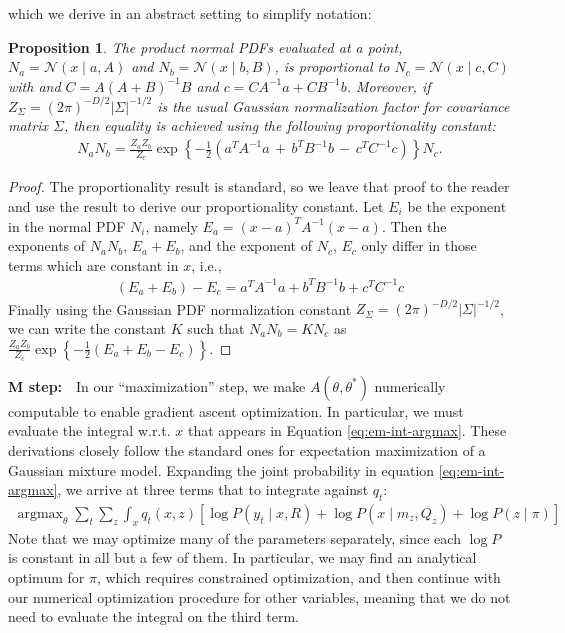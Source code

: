\documentclass{article}         %
\newtheorem{proposition}{Proposition}[section]
\DeclareMathOperator{\argmax}{\arg\max}
\newcommand{\inv}{^{-1}}
\newcommand{\NN}{\mathcal{N}}
\newcommand{\abs}[1]{\left| #1 \right|}
\newcommand{\cb}[1]{\left\{ #1 \right\}}
\newcommand{\pn}[1]{\left( #1 \right)}
\newcommand{\bc}[1]{\left[ #1 \right]}
\begin{document}
which we derive in an abstract setting to simplify notation:
\begin{proposition}
    The product normal PDFs evaluated at a point, $N_a = \NN(x\mid a, A)$ and $N_b = \NN(x\mid b, B)$, is proportional to $N_c = \NN(x\mid c, C)$ with and $C = A\pn{A + B}\inv B$ and $c = CA\inv a + CB\inv b$. Moreover, if $Z_\Sigma = \pn{2\pi}^{-D/2}\abs{\Sigma}^{-1/2}$ is the usual Gaussian normalization factor for covariance matrix $\Sigma$, then equality is achieved using the following proportionality constant:
    \begin{align}
        N_a N_b = \frac{Z_aZ_b}{Z_c} \exp\cb{-\frac{1}{2}\pn{a^TA\inv a \,+\, b^TB\inv b \,-\, c^T C\inv c}} N_c.
    \end{align}
\end{proposition}
\begin{proof}
The proportionality result is standard, so we leave that proof to the reader and use the result to derive our proportionality constant. Let $E_i$ be the exponent in the normal PDF $N_i$, namely $E_a = (x - a)^TA\inv (x - a)$. Then the exponents of $N_aN_b$, $E_a + E_b$, and the exponent of $N_c$, $E_c$ only differ in those terms which are constant in $x$, i.e., 
\begin{align}
    \pn{E_a + E_b} - E_c = a^TA\inv a + b^TB\inv b + c^T C\inv c
\end{align}
Finally using the Gaussian PDF normalization constant $Z_\Sigma = \pn{2\pi}^{-D/2}\abs{\Sigma}^{-1/2}$, we can write the constant $K$ such that $N_aN_b = K N_c$ as $\frac{Z_aZ_b}{Z_c} \exp\cb{-\frac{1}{2}\pn{E_a + E_b - E_c}}$.
\end{proof}

\textbf{M step:}\ \ In our ``maximization'' step, we make $A(\theta, \theta^*)$ numerically computable to enable gradient ascent optimization. In particular, we must evaluate the integral w.r.t. $x$ that appears in Equation \ref{eq:em-int-argmax}. These derivations closely follow the standard ones for expectation maximization of a Gaussian mixture model. Expanding the joint probability in equation \ref{eq:em-int-argmax}, we arrive at three terms that to integrate against $q_t$:
\begin{align}
    \argmax_{\theta} \sum_{t}\sum_{z}\int_{x} q_t(x, z) \bc{ \log P(y_t \mid x, R) + \log P(x \mid m_{z}, Q_{z}) + \log P(z \mid \pi)}
\end{align}
Note that we may optimize many of the parameters separately, since each $\log P$ is constant in all but a few of them. In particular, we may find an analytical optimum for $\pi$, which requires constrained optimization, and then continue with our numerical optimization procedure for other variables, meaning that we do not need to evaluate the integral on the third term.
\end{document}

